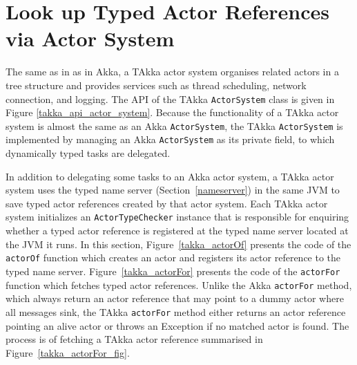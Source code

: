 \section{Look up Typed Actor References via Actor System}
\label{sec:takka_look_up_actor_reference}

The same as in as in Akka, a TAkka actor system organises related actors in a tree 
structure and provides services such as thread scheduling, network connection, 
and logging.  The API of the TAkka {\tt ActorSystem} class is given in Figure 
\ref{takka_api_actor_system}.  Because the functionality of a TAkka actor system 
is almost the same as an Akka {\tt ActorSystem}, the TAkka {\tt ActorSystem} is 
implemented by managing an Akka {\tt ActorSystem} as its private field, to 
which dynamically typed tasks are delegated.   %

In addition to delegating some tasks to an Akka actor system, a TAkka actor 
system uses the typed name server (Section~\ref{nameserver}) in the same JVM to save typed actor 
references created by that actor system.  Each TAkka actor system initializes 
an {\tt ActorTypeChecker} instance that is responsible for enquiring whether a 
typed actor reference is registered at the typed name server located at the JVM 
it runs.  In this section, Figure~\ref{takka_actorOf} presents the code of the 
{\tt actorOf} function which creates an actor and registers its actor reference 
to the typed name server.  Figure~\ref{takka_actorFor} presents the code of the 
{\tt actorFor} function which fetches typed actor references.  Unlike the Akka {\tt actorFor} method,
which always return an actor reference that may point to a dummy actor where all messages sink, 
the TAkka  {\tt actorFor} method either returns an actor reference pointing an alive actor or
throws an Exception if no matched actor is found.  The process is of fetching a TAkka actor reference
summarised in Figure~\ref{takka_actorFor_fig}.



